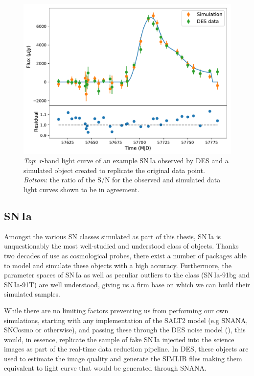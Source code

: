 \begin{figure}
  \includegraphics[width=\textwidth]{Figures/Chapter5/IaSim.pdf}
  \caption{\textit{Top}: \textit{r}-band light curve of an example SN\,Ia observed by DES and a simulated object created to replicate the original data point. \textit{Bottom}: the ratio of the S/N for the observed and simulated data light curves shown to be in agreement.}
  \label{fig:IaNoiseComp}
\end{figure}

\subsection{SN\,Ia}
Amongst the various SN classes simulated as part of this thesis, SN\,Ia is unquestionably the most well-studied and understood class of objects. Thanks two decades of use as cosmological probes, there exist a number of packages able to model and simulate these objects with a high accuracy. Furthermore, the parameter spaces of SN\,Ia as well as peculiar outliers to the class (SN\,Ia-91bg and SN\,Ia-91T) are well understood, giving us a firm base on which we can build their simulated samples.

While there are no limiting factors preventing us from performing our own simulations, starting with any implementation of the SALT2 model (e.g SNANA, SNCosmo or otherwise), and passing these through the DES noise model (), this would, in essence, replicate the sample of fake SN\,Ia injected into the science images as part of the real-time data reduction pipeline. In DES, these objects are used to estimate the image quality and generate the \textsc{SIMLIB} files making them equivalent to light curve that would be generated through SNANA.

